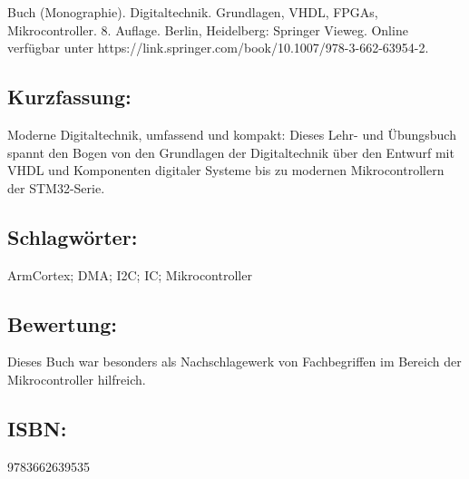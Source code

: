 \hfill
\begin{minipage}{0.48\textwidth}
Buch (Monographie). Digitaltechnik. Grundlagen, VHDL, FPGAs, Mikrocontroller.
8. Auflage. Berlin, Heidelberg: Springer Vieweg. Online verfügbar unter https://link.springer.com/book/10.1007/978-3-662-63954-2.
\subsection*{Kurzfassung:}
Moderne Digitaltechnik, umfassend und kompakt: Dieses Lehr- und Übungsbuch spannt den Bogen von den Grundlagen der Digitaltechnik über den Entwurf mit VHDL und Komponenten digitaler Systeme bis zu modernen Mikrocontrollern der STM32-Serie.	
\end{minipage}
\subsection*{Schlagwörter:}
ArmCortex; DMA; I2C; IC; Mikrocontroller
\subsection*{Bewertung:}
Dieses Buch war besonders als Nachschlagewerk von Fachbegriffen im Bereich der Mikrocontroller hilfreich.
\subsection*{ISBN:}
9783662639535

